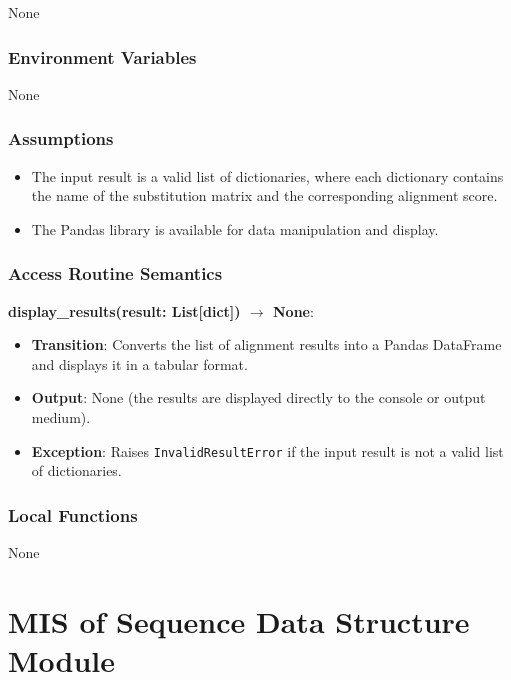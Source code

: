 \documentclass[12pt, titlepage]{article}
\begin{document}
None

\subsubsection{Environment Variables}

None

\subsubsection{Assumptions}

\begin{itemize}
    \item The input result is a valid list of dictionaries, where each dictionary contains the name of the substitution matrix and the corresponding alignment score.
    \item The Pandas library is available for data manipulation and display.
\end{itemize}

\subsubsection{Access Routine Semantics}

\noindent \textbf{display\_results(result: List[dict]) $\rightarrow$ None}:
\begin{itemize}
    \item \textbf{Transition}: Converts the list of alignment results into a Pandas DataFrame and displays it in a tabular format.
    \item \textbf{Output}: None (the results are displayed directly to the console or output medium).
    \item \textbf{Exception}: Raises \texttt{InvalidResultError} if the input result is not a valid list of dictionaries.
\end{itemize}

\subsubsection{Local Functions}

None

\newpage
\section{MIS of Sequence Data Structure Module} \label{mSDS}
\end{document}
